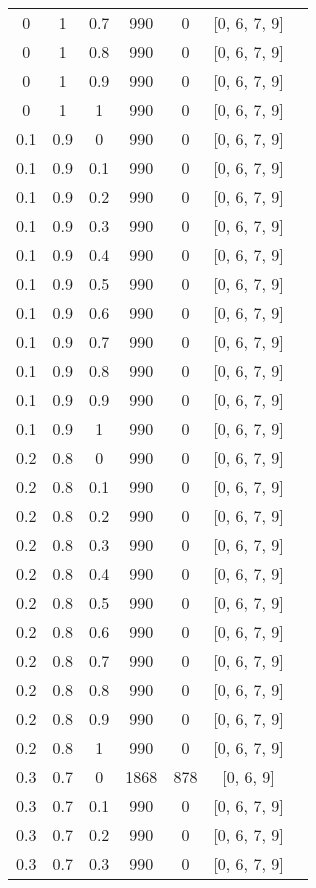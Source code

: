 \begin{table}[H]
\begin{center}
\begin{tabular}{|c@{\hspace{7mm}}|c@{\hspace{7mm}}|c@{\hspace{7mm}}|c@{\hspace{7mm}}|c@{\hspace{7mm}}|c@{\hspace{7mm}}|c|}
0    & 1    & 0.7  & 990   & 0     & [0, 6, 7, 9]\\
0    & 1    & 0.8  & 990   & 0     & [0, 6, 7, 9]\\
0    & 1    & 0.9  & 990   & 0     & [0, 6, 7, 9]\\
0    & 1    & 1    & 990   & 0     & [0, 6, 7, 9]\\
0.1  & 0.9  & 0    & 990   & 0     & [0, 6, 7, 9]\\
0.1  & 0.9  & 0.1  & 990   & 0     & [0, 6, 7, 9]\\
0.1  & 0.9  & 0.2  & 990   & 0     & [0, 6, 7, 9]\\
0.1  & 0.9  & 0.3  & 990   & 0     & [0, 6, 7, 9]\\
0.1  & 0.9  & 0.4  & 990   & 0     & [0, 6, 7, 9]\\
0.1  & 0.9  & 0.5  & 990   & 0     & [0, 6, 7, 9]\\
0.1  & 0.9  & 0.6  & 990   & 0     & [0, 6, 7, 9]\\
0.1  & 0.9  & 0.7  & 990   & 0     & [0, 6, 7, 9]\\
0.1  & 0.9  & 0.8  & 990   & 0     & [0, 6, 7, 9]\\
0.1  & 0.9  & 0.9  & 990   & 0     & [0, 6, 7, 9]\\
0.1  & 0.9  & 1    & 990   & 0     & [0, 6, 7, 9]\\
0.2  & 0.8  & 0    & 990   & 0     & [0, 6, 7, 9]\\
0.2  & 0.8  & 0.1  & 990   & 0     & [0, 6, 7, 9]\\
0.2  & 0.8  & 0.2  & 990   & 0     & [0, 6, 7, 9]\\
0.2  & 0.8  & 0.3  & 990   & 0     & [0, 6, 7, 9]\\
0.2  & 0.8  & 0.4  & 990   & 0     & [0, 6, 7, 9]\\
0.2  & 0.8  & 0.5  & 990   & 0     & [0, 6, 7, 9]\\
0.2  & 0.8  & 0.6  & 990   & 0     & [0, 6, 7, 9]\\
0.2  & 0.8  & 0.7  & 990   & 0     & [0, 6, 7, 9]\\
0.2  & 0.8  & 0.8  & 990   & 0     & [0, 6, 7, 9]\\
0.2  & 0.8  & 0.9  & 990   & 0     & [0, 6, 7, 9]\\
0.2  & 0.8  & 1    & 990   & 0     & [0, 6, 7, 9]\\
0.3  & 0.7  & 0    & 1868  & 878   & [0, 6, 9]\\
0.3  & 0.7  & 0.1  & 990   & 0     & [0, 6, 7, 9]\\
0.3  & 0.7  & 0.2  & 990   & 0     & [0, 6, 7, 9]\\
0.3  & 0.7  & 0.3  & 990   & 0     & [0, 6, 7, 9]\\
			\hline
	\end{tabular}

\end{center}

\end{table}
\clearpage

